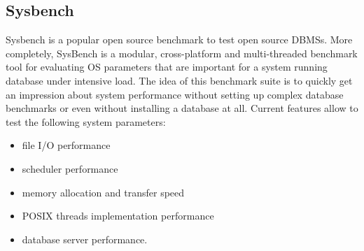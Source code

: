 \documentclass[10pt, conference]{IEEEtran}
\begin{document}
\subsection{Sysbench}
\indent Sysbench is a popular open source benchmark to test open source DBMSs. More completely, SysBench is a modular, cross-platform and multi-threaded benchmark tool for evaluating OS parameters that are important for a system running database under intensive load. The idea of this benchmark suite is to quickly get an impression about system performance without setting up complex database benchmarks or even without installing a database at all. Current features allow to test the following system parameters:

\begin{itemize}
\item file I/O performance
\item scheduler performance
\item memory allocation and transfer speed
\item POSIX threads implementation performance
\item database server performance.
\end{itemize}
\end{document}
